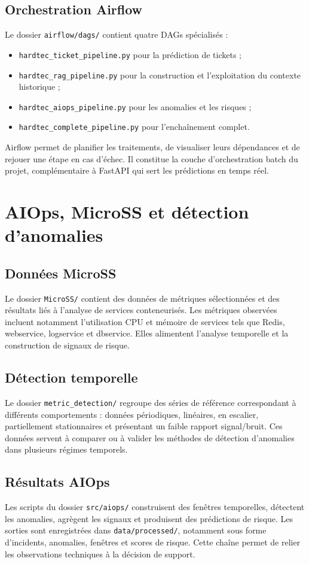\documentclass[11pt,a4paper]{report}
\begin{document}
\section{Orchestration Airflow}
Le dossier \texttt{airflow/dags/} contient quatre DAGs spécialisés :
\begin{itemize}[leftmargin=1.3em]
    \item \texttt{hardtec\_ticket\_pipeline.py} pour la prédiction de tickets ;
    \item \texttt{hardtec\_rag\_pipeline.py} pour la construction et l’exploitation du contexte historique ;
    \item \texttt{hardtec\_aiops\_pipeline.py} pour les anomalies et les risques ;
    \item \texttt{hardtec\_complete\_pipeline.py} pour l’enchaînement complet.
\end{itemize}
Airflow permet de planifier les traitements, de visualiser leurs dépendances et de rejouer une étape en cas d’échec. Il constitue la couche d’orchestration batch du projet, complémentaire à FastAPI qui sert les prédictions en temps réel.

\chapter{AIOps, MicroSS et détection d’anomalies}
\section{Données MicroSS}
Le dossier \texttt{MicroSS/} contient des données de métriques sélectionnées et des résultats liés à l’analyse de services conteneurisés. Les métriques observées incluent notamment l’utilisation CPU et mémoire de services tels que Redis, webservice, logservice et dbservice. Elles alimentent l’analyse temporelle et la construction de signaux de risque.

\section{Détection temporelle}
Le dossier \texttt{metric\_detection/} regroupe des séries de référence correspondant à différents comportements : données périodiques, linéaires, en escalier, partiellement stationnaires et présentant un faible rapport signal/bruit. Ces données servent à comparer ou à valider les méthodes de détection d’anomalies dans plusieurs régimes temporels.

\section{Résultats AIOps}
Les scripts du dossier \texttt{src/aiops/} construisent des fenêtres temporelles, détectent les anomalies, agrègent les signaux et produisent des prédictions de risque. Les sorties sont enregistrées dans \texttt{data/processed/}, notamment sous forme d’incidents, anomalies, fenêtres et scores de risque. Cette chaîne permet de relier les observations techniques à la décision de support.
\end{document}
